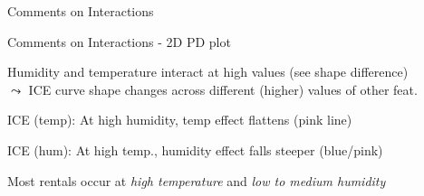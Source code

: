 \documentclass[10pt,compress,t,notes=noshow, xcolor=table]{beamer}
\begin{document}
\begin{framev}[align=top]{Comments on Interactions}
\end{framev}


\begin{framev}[align=top]{Comments on Interactions - 2D PD plot}
\begin{itemizeM}
\item Humidity and temperature interact at high values (see shape difference)\\
$\leadsto$ ICE curve shape changes across different (higher) values of other feat.%
\begin{itemizeS}
\item ICE (temp): At high humidity, temp effect flattens (pink line)
\item ICE (hum): At high temp., humidity effect falls steeper (blue/pink)
\end{itemizeS}
\item Most rentals occur at \textit{high temperature} and \textit{low to medium humidity}
\end{itemizeM}
%
\end{framev}
\end{document}
